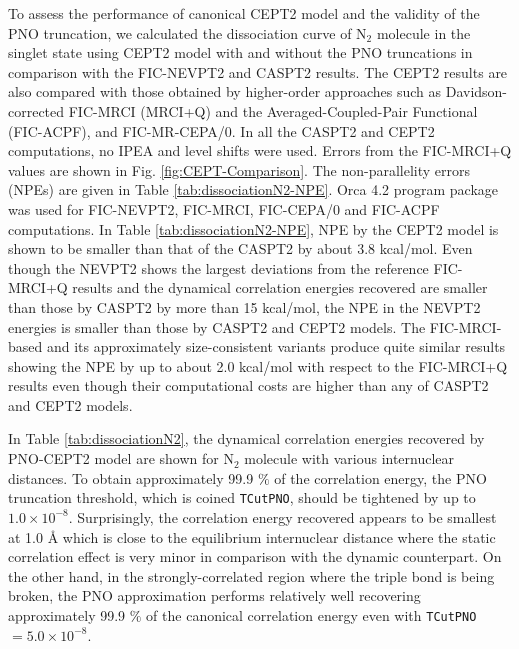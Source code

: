 \documentclass[aip,jcp,amsmath,twocolumn,floatfix,reprint,fleqn]{revtex4-1}
\begin{document}
%
To assess the performance of canonical CEPT2 model and the validity of the PNO truncation, we calculated the dissociation curve of N${}_2$ molecule in the singlet state using CEPT2 model with and without the PNO truncations in comparison with the FIC-NEVPT2 and CASPT2 results.
%
The CEPT2 results are also compared with those obtained by higher-order approaches such as Davidson-corrected FIC-MRCI (MRCI+Q) and the Averaged-Coupled-Pair Functional (FIC-ACPF), and FIC-MR-CEPA/0.
%
In all the CASPT2 and CEPT2 computations, no IPEA and level shifts were used.
%
Errors from the FIC-MRCI+Q values are shown in Fig. \ref{fig:CEPT-Comparison}.
%
The non-parallelity errors (NPEs) are given in Table \ref{tab:dissociationN2-NPE}.
%
Orca 4.2 program package\cite{WCMS:WCMS1327} was used for FIC-NEVPT2, FIC-MRCI,\cite{doi:10.1063/1.4959029} FIC-CEPA/0 and FIC-ACPF\cite{Gdanitz1988} computations.
%
In Table \ref{tab:dissociationN2-NPE}, NPE by the CEPT2 model is shown to be smaller than that of the CASPT2 by about 3.8 kcal/mol.
%
%
Even though the NEVPT2 shows the largest deviations from the reference FIC-MRCI+Q results and the dynamical correlation energies recovered are smaller than those by CASPT2 by more than 15 kcal/mol, the NPE in the NEVPT2 energies is smaller than those by CASPT2 and CEPT2 models.
%
The FIC-MRCI-based and its approximately size-consistent variants produce quite similar results showing the NPE by up to about 2.0 kcal/mol with respect to the FIC-MRCI+Q results even though their computational costs are higher than any of CASPT2 and CEPT2 models.

%
In Table \ref{tab:dissociationN2}, the dynamical correlation energies recovered by PNO-CEPT2 model are shown for N${}_2$ molecule with various internuclear distances.
%
To obtain approximately 99.9 $\%$ of the correlation energy, the PNO truncation threshold, which is coined {\tt TCutPNO}, should be tightened by up to $1.0\times 10^{-8}$.
%
Surprisingly, the correlation energy recovered appears to be smallest at 1.0 {\AA} which is close to the equilibrium internuclear distance where the static correlation effect is very minor in comparison with the dynamic counterpart.
%
On the other hand, in the strongly-correlated region where the triple bond is being broken, the PNO approximation performs relatively well recovering approximately 99.9 $\%$ of the canonical correlation energy even with {\tt TCutPNO}$=5.0\times 10^{-8}$.
\end{document}
